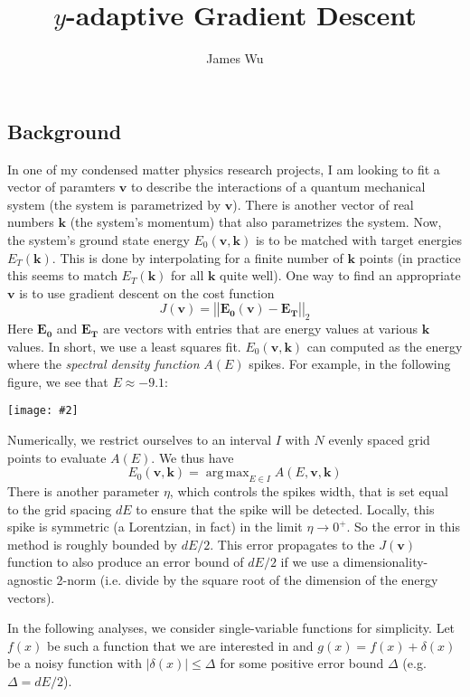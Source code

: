 \documentclass[letterpaper,11pt]{article}
\title{$y$-adaptive Gradient Descent}
\author{James Wu \quad 92277235}
\date{}
\newcommand*{\abs}[1]{\left| #1 \right|}
\newcommand*{\norm}[1]{\abs{\abs{\mathbf{#1}}}}
\DeclareMathOperator*{\argmax}{arg\,max}
\newcommand*{\qimg}[2]{\\ \begin{center}\texttt{[image: \#2]}\end{center}}
\begin{document}
\maketitle
\begin{flushleft}
    
    \section{Background}
    In one of my condensed matter physics research projects, I am looking to fit a vector of paramters $\mathbf{v}$ to describe the interactions of a quantum mechanical system (the system is parametrized by $\mathbf{v}$). There is another vector of real numbers $\mathbf{k}$ (the system's momentum) that also parametrizes the system. Now, the system's ground state energy $E_0(\mathbf{v}, \mathbf{k})$ is to be matched with target energies $E_T(\mathbf{k})$. This is done by interpolating for a finite number of $\mathbf{k}$ points (in practice this seems to match $E_T(\mathbf{k})$ for all $\mathbf{k}$ quite well). One way to find an appropriate $\mathbf{v}$ is to use gradient descent on the cost function
    $$J(\mathbf{v}) = \norm{\mathbf{E_0}(\mathbf{v}) - \mathbf{E_T}}_2$$
    Here $\mathbf{E_0}$ and $\mathbf{E_T}$ are vectors with entries that are energy values at various $\mathbf{k}$ values. In short, we use a least squares fit. $E_0(\mathbf{v}, \mathbf{k})$ can computed as the energy where the \textit{spectral density function} $A(E)$ spikes. For example, in the following figure, we see that $E \approx -9.1$:
    \qimg{0.8}{img/spec.jpg}
    Numerically, we restrict ourselves to an interval $I$ with $N$ evenly spaced grid points to evaluate $A(E)$. We thus have
    $$E_0(\mathbf{v}, \mathbf{k}) = \argmax_{E \in I} A(E, \mathbf{v}, \mathbf{k})$$
    There is another parameter $\eta$, which controls the spikes width, that is set equal to the grid spacing $dE$ to ensure that the spike will be detected. Locally, this spike is symmetric (a Lorentzian, in fact) in the limit $\eta \to 0^+$. So the error in this method is roughly bounded by $dE/2$. This error propagates to the $J(\mathbf{v})$ function to also produce an error bound of $dE/2$ if we use a dimensionality-agnostic 2-norm (i.e. divide by the square root of the dimension of the energy vectors).

    In the following analyses, we consider single-variable functions for simplicity. Let $f(x)$ be such a function that we are interested in and $g(x) = f(x) + \delta(x)$ be a noisy function with $|\delta(x)| \leq \Delta$ for some positive error bound $\Delta$ (e.g. $\Delta = dE/2$).


\end{flushleft}
\end{document}
